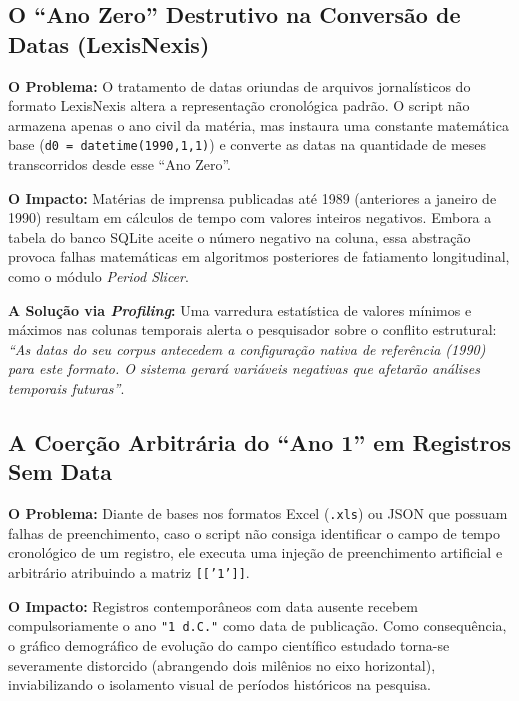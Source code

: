 \documentclass[
	oneside,
	a4paper,
	12pt,
	chapter=TITLE,
	section=TITLE,
	english,
	brazilian
]{abntex2}
\begin{document}
\begin{apendicesenv}
\FloatBarrier
\subsection{O ``Ano Zero'' Destrutivo na Conversão de Datas (LexisNexis)}\label{sec:o_ano_zero_destrutivo_na_conversao_de_da}


\textbf{O Problema:} O tratamento de datas oriundas de arquivos jornalísticos do formato LexisNexis altera a representação cronológica padrão. O script não armazena apenas o ano civil da matéria, mas instaura uma constante matemática base (\texttt{d0 = datetime(1990,1,1)}) e converte as datas na quantidade de meses transcorridos desde esse ``Ano Zero''.

\textbf{O Impacto:} Matérias de imprensa publicadas até 1989 (anteriores a janeiro de 1990) resultam em cálculos de tempo com valores inteiros negativos. Embora a tabela do banco SQLite aceite o número negativo na coluna, essa abstração provoca falhas matemáticas em algoritmos posteriores de fatiamento longitudinal, como o módulo \textit{Period Slicer}.

\textbf{A Solução via \textit{Profiling}:} Uma varredura estatística de valores mínimos e máximos nas colunas temporais alerta o pesquisador sobre o conflito estrutural: \textit{``As datas do seu corpus antecedem a configuração nativa de referência (1990) para este formato. O sistema gerará variáveis negativas que afetarão análises temporais futuras''}.

\FloatBarrier
\subsection{A Coerção Arbitrária do ``Ano 1'' em Registros Sem Data}\label{sec:a_coercao_arbitraria_do_ano_1_em_registr}


\textbf{O Problema:} Diante de bases nos formatos Excel (\texttt{.xls}) ou JSON que possuam falhas de preenchimento, caso o script não consiga identificar o campo de tempo cronológico de um registro, ele executa uma injeção de preenchimento artificial e arbitrário atribuindo a matriz \texttt{[['1']]}.

\textbf{O Impacto:} Registros contemporâneos com data ausente recebem compulsoriamente o ano \texttt{"1 d.\allowbreak C."} como data de publicação. Como consequência, o gráfico demográfico de evolução do campo científico estudado torna-se severamente distorcido (abrangendo dois milênios no eixo horizontal), inviabilizando o isolamento visual de períodos históricos na pesquisa.


\end{apendicesenv}
\end{document}
